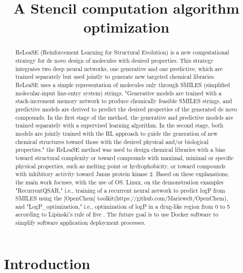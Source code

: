 \documentclass[conference]{IEEEtran}
\begin{document}
\title{A Stencil computation algorithm optimization}


\author{
}

\maketitle

\begin{abstract}
ReLeaSE (Reinforcement Learning for Structural Evolution) is a new computational strategy for de novo design of molecules with desired properties. This strategy integrates two deep neural networks, one generative and one predictive, which are trained separately but used jointly to generate new targeted chemical libraries.
ReLeaSE uses a simple representation of molecules only through SMILES (simplified molecular-input line-entry system) strings.
"Generative models are trained with a stack-increment memory network to produce chemically feasible SMILES strings, and predictive models are derived to predict the desired properties of the generated de novo compounds. In the first stage of the method, the generative and predictive models are trained separately with a supervised learning algorithm. In the second stage, both models are jointly trained with the RL approach to guide the generation of new chemical structures toward those with the desired physical and/or biological properties."
the ReLeaSE method was used to design chemical libraries with a bias toward structural complexity or toward compounds with maximal, minimal or specific physical properties, such as melting point or hydrophobicity, or toward compounds with inhibitory activity toward Janus protein kinase 2.
Based on these explanations, the main work focuses, with the use of OS. Linux, on the demonstration examples "RecurrentQSAR," i.e., training of a recurrent neural network to predict logP from SMILES using the [OpenChem] toolkit(https://github.com/Mariewelt/OpenChem), and "LogP\_optimization," i.e., optimization of logP in a drug-like region from 0 to 5 according to Lipinski's rule of five \cite{lipinski-rule}.
The future goal is to use Docker software to simplify software application deployment processes.

\end{abstract}

\section{Introduction}\label{sec:intro}
\end{document}
